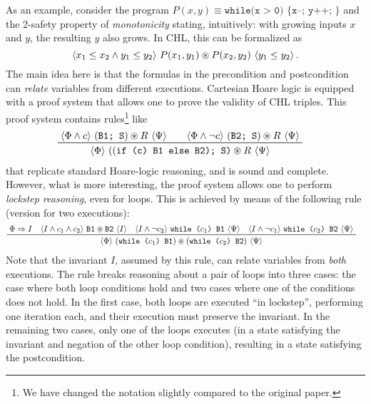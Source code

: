 As an example, consider the program $P(x,y) \equiv \texttt{while(x > 0) \{ x--; y++; \} }$ and the 2-safety property
of \emph{monotonicity} stating, intuitively: with growing inputs $x$ and $y$, the resulting $y$ also grows.
In CHL, this can be formalized as
\begin{equation}\label{eq:mono_formula}
\langle x_1 \leq x_2 \land y_1 \leq y_2  \rangle\ P(x_1, y_1)\circledast{}P(x_2, y_2)\  \langle y_1 \leq y_2 \rangle \, .
\end{equation}
The main idea here is that the formulas in the precondition and
postcondition can \emph{relate} variables from different executions.
%
Cartesian Hoare logic is equipped with a proof system that allows one to prove the validity of CHL triples.
This proof system contains rules\footnote{We have changed the notation
  slightly compared to the original paper.} like
\begin{align}\label{chlRule:If}
    & \prftree[l]{}%
      { %
        { \chl{\Phi \land c}{(\texttt{B1; S}) \st R}{\Psi} } \qquad
        { \chl{\Phi \land \neg c}{(\texttt{B2; S}) \st R}{\Psi} }
      }
      { \chl{\Phi}{((\texttt{if (c) B1 else  B2); S)} \st R}{\Psi} }
\end{align}
that replicate standard Hoare-logic reasoning, and is sound and complete. 
However, what is more interesting, the proof system allows one to perform \emph{lockstep reasoning},
even for loops. This is achieved by means of the following rule (version for two executions):
\begin{align*}
  & \prftree[l]{}%
    {\Phi\Rightarrow I \quad
    \chl{I \land c_1 \land c_2}{\texttt{B1} \st \texttt{B2}}{I} \quad
    \chl{I \land \neg c_2}{\texttt{while (}c_1\texttt{) {B1}}}{\Psi} \quad
    \chl{I \land \neg c_1}{\texttt{while (}c_2\texttt{) {B2}}}{\Psi}    
  }
  { \chl{\Phi}{(\texttt{while (}c_1\texttt{) {B1}}) \st (\texttt{while (}c_2\texttt{) {B2}})} {\Psi}}
\end{align*}
Note that the invariant $I$, assumed by this rule, can relate variables from \emph{both} executions.
%
The rule breaks reasoning about a pair of loops into three cases: the case
where both loop conditions hold and two cases where one of the conditions
does not hold.  In the first case, both loops are executed ``in lockstep'',
performing one iteration each, and their execution must preserve the
invariant. In the remaining two cases, only one of the loops executes (in a
state satisfying the invariant and negation of the other loop condition),
resulting in a state satisfying the postcondition.


